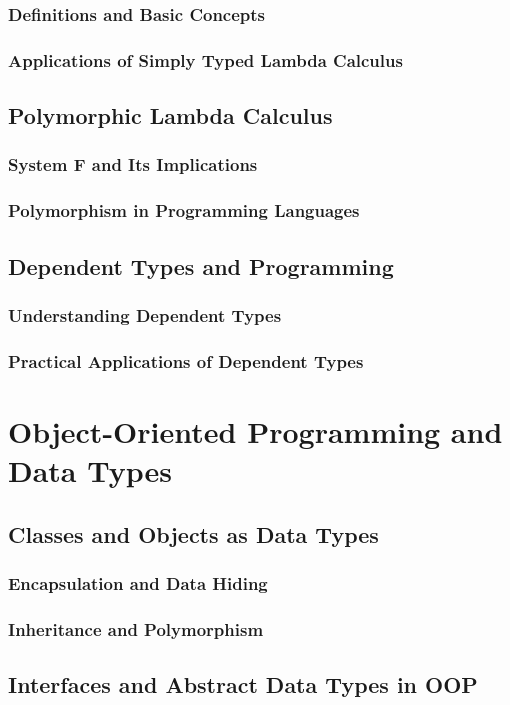 \documentclass[12pt, oneside]{book}
\begin{document}
\subsubsection{Definitions and Basic Concepts}
\subsubsection{Applications of Simply Typed Lambda Calculus}
\subsection{Polymorphic Lambda Calculus}
\subsubsection{System F and Its Implications}
\subsubsection{Polymorphism in Programming Languages}
\subsection{Dependent Types and Programming}
\subsubsection{Understanding Dependent Types}
\subsubsection{Practical Applications of Dependent Types}

\section{Object-Oriented Programming and Data Types}
\subsection{Classes and Objects as Data Types}
\subsubsection{Encapsulation and Data Hiding}
\subsubsection{Inheritance and Polymorphism}
\subsection{Interfaces and Abstract Data Types in OOP}
\end{document}
